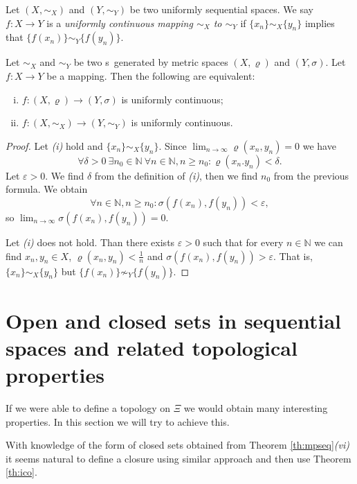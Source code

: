 \begin{define}\label{def:uncont}
Let $(X,\sim_X)$ and $(Y,\sim_Y)$ be two uniformly sequential spaces. We say $f:X\to Y$ is a \emph{uniformly continuous mapping $\sim_X$ to $\sim_Y$} if $\{x_n\}\sim_X\{y_n\}$ implies that $\{f(x_n)\}\sim_Y\{f(y_n)\}$.
\end{define}

\begin{theorem} \label{th:contpr}
Let $\sim_X$ and $\sim_Y$ be two \uss{}s\ generated by metric spaces $(X,\varrho)$ and $(Y,\sigma)$. Let $f:X\to Y$ be a mapping. Then the following are equivalent:
\begin{enumerate}[(i)]
	\item $f:(X,\varrho)\to (Y, \sigma)$ is uniformly continuous;
	\item $f:(X,\sim_X)\to (Y,\sim_Y)$ is uniformly continuous.
\end{enumerate}
\end{theorem} 
\begin{proof}
Let \emph{(i)} hold and $\{x_n\}\sim_X\{y_n\}$. Since $\lim_{n\to\infty}\varrho(x_n,y_n)=0$ we have
\[
	\forall \delta>0\ \exists n_0\in\mathbb{N}\ \forall n\in\mathbb{N}, n\ge n_0: \varrho(x_n.y_n)<\delta.
\]
Let $\varepsilon>0$. We find $\delta$ from the definition of \emph{(i)}, then we find $n_0$ from the previous formula. We obtain
\[
	\forall n\in\mathbb{N}, n\ge n_0: \sigma(f(x_n),f(y_n))<\varepsilon,
\]
so $\lim_{n\to\infty}\sigma(f(x_n),f(y_n))=0$.

Let \emph{(i)} does not hold. Than there exists $\varepsilon>0$ such that for every $n\in\mathbb{N}$ we can find $x_n,y_n\in X$, $\varrho(x_n,y_n)<\frac{1}{n}$ and $\sigma(f(x_n),f(y_n))>\varepsilon$. That is, $\{x_n\}\sim_X\{y_n\}$ but $\{f(x_n)\}\not\sim_Y\{f(y_n)\}$.
\end{proof}

\section{Open and closed sets in sequential spaces and related topological properties}

If we were able to define a topology on $\Xi$ we would obtain many interesting properties. In this section we will try to achieve this.

With knowledge of the form of closed sets obtained from Theorem \ref{th:mpseq}\emph{(vi)} it seems natural to define a closure using similar approach and then use Theorem \ref{th:ico}.

